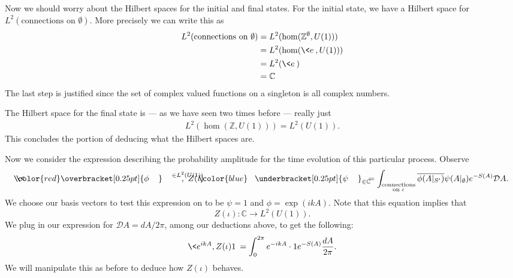 Now we should worry about the Hilbert spaces for the initial and
final states. For the initial state, we have a Hilbert space for
$L^{2}(\text{connections on }\emptyset)$. More precisely we can
write this as
\begin{subequations}
\begin{align}
L^{2}(\text{connections on }\emptyset) &= L^{2}(\hom(\mathbb{Z}^{\emptyset},U(1)))\\
&= L^{2}(\hom(\<e\>,U(1)))\\
&= L^{2}(\<e\>)\\
&= \mathbb{C}
\end{align}
\end{subequations}
The last step is justified since the set of complex valued
functions on a singleton is all complex numbers.

The Hilbert space for the final state is --- as we have seen two
times before --- really just
\begin{subequations}
\begin{align}
L^{2}(\hom(\mathbb{Z},U(1))) = L^{2}(U(1)).
\end{align}
\end{subequations}
This concludes the portion of deducing what the Hilbert spaces
are.

Now we consider the expression describing the probability
amplitude for the time evolution of this particular
process. Observe
\begin{equation}%
\<\!\!\!\!\!\!\!\!{\color{red}\overbracket[0.25pt]{\phi\;\;\;\;}^{\;\;\;\;\;\in L^{2}(U(1))}}\!\!\!\!\!\!\!\!\!\!\!\!\!\!\!\!,\,\,Z(\iota)\!\!\!\!{\color{blue}\;\;\;\underbracket[0.25pt]{\psi\;\;\;\;}_{\in\mathbb{C}}}\!\!\!\!\!\> =
\int_{\substack{\text{connections}\\\text{on }\iota}} \overline{\phi(A|_{S'})}\psi(A|_{\emptyset})e^{-S(A)}\mathcal{D}A.
\end{equation}
We choose our basis vectors to test this expression on to be
$\psi=1$ and $\phi=\exp(ikA)$. Note that this equation implies
that 
\begin{equation}%
Z(\iota):\mathbb{C}\to L^{2}(U(1)).
\end{equation}
We plug in our expression for $\mathcal{D}A=dA/2\pi$, among our
deductions above, to get the following:
\begin{equation}%
\<e^{ikA},Z(\iota)1\> = \int^{2\pi}_{0} e^{-ikA}\cdot 1e^{-S(A)}\frac{dA}{2\pi}.
\end{equation}
We will manipulate this as before to deduce how $Z(\iota)$
behaves.

